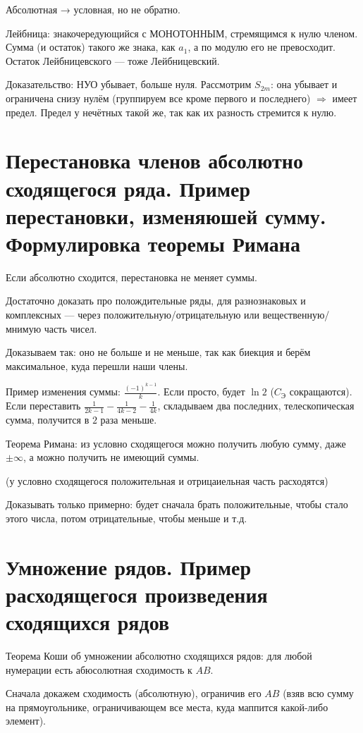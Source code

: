 \documentclass[12pt, a4paper]{article}
\begin{document}
    Абсолютная → условная, но не обратно.

    Лейбница: знакочередующийся с МОНОТОННЫМ, стремящимся к нулю членом.
    Сумма (и остаток) такого же знака, как $a_1$, а по модулю его не превосходит. Остаток Лейбницевского — тоже Лейбницевский.
    
    Доказательство: НУО убывает, больше нуля. Рассмотрим $S_{2m}$: она убывает и ограничена снизу нулём (группируем все кроме первого и последнего) 
    $\Rightarrow$ имеет предел. Предел у нечётных такой же, так как их разность стремится к нулю.


\section{Перестановка членов абсолютно сходящегося ряда. Пример перестановки, изменяюшей сумму. Формулировка теоремы Римана}

    Если абсолютно сходится, перестановка не меняет суммы. 
    
    Достаточно доказать про полождительные ряды, для разнознаковых и комплексных — 
    через положительную/отрицательную или вещественную/мнимую часть чисел.
    
    Доказываем так: оно не больше и не меньше, так как биекция и берём максимальное, куда перешли наши члены.

    Пример изменения суммы: $\frac{(-1)^{k - 1}}{k}$. Если просто, будет $\ln 2$ ($C_{Э}$ сокращаются).
    Если переставить $\frac{1}{2k - 1} - \frac{1}{4k - 2} - \frac{1}{4k}$, складываем два последних, телескопическая сумма, получится в $2$ раза меньше.

    Теорема Римана: из условно сходящегося можно получить любую сумму, даже $±∞$, а можно получить не имеющий суммы.

    (у условно сходящегося положительная и отрицаиельная часть расходятся)

    Доказывать только примерно: будет сначала брать положительные, чтобы стало этого числа, потом отрицательные, чтобы меньше и т.д.


\section{Умножение рядов. Пример расходящегося произведения сходящихся рядов}

    Теорема Коши об умножении абсолютно сходящихся рядов:    для любой нумерации есть абюсолютная сходимость к $AB$.

    Сначала докажем сходимость (абсолютную), ограничив его $AB$
    (взяв всю сумму на прямоугольнике, ограничивающем все места, куда маппится какой-либо элемент).
\end{document}
